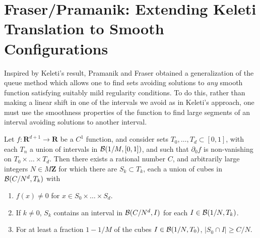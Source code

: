 \section{Fraser/Pramanik: Extending Keleti Translation to Smooth Configurations}

Inspired by Keleti's result, Pramanik and Fraser obtained a generalization of the queue method which allows one to find sets avoiding solutions to {\it any} smooth function satisfying suitably mild regularity conditions. To do this, rather than making a linear shift in one of the intervals we avoid as in Keleti's approach, one must use the smoothness properties of the function to find large segments of an interval avoiding solutions to another interval.

\begin{theorem}
    Let $f: \mathbf{R}^{d+1} \to \mathbf{R}$ be a $C^1$ function, and consider sets $T_0, \dots, T_d \subset [0,1]$, with each $T_n$ a union of intervals in $\operatorname{\mathcal{B}}(1/M,[0,1])$, and such that $\partial_0 f$ is non-vanishing on $T_0 \times \dots \times T_d$. Then there exists a rational number $C$, and arbitrarily large integers $N \in M \mathbf{Z}$ for which there are $S_k \subset T_k$, each a union of cubes in $\operatorname{\mathcal{B}}(C/N^d,T_k)$ with
    \begin{enumerate}
        \item $f(x) \neq 0$ for $x \in S_0 \times \dots \times S_d$.

        \item If $k \neq 0$, $S_k$ contains an interval in $\operatorname{\mathcal{B}}(C/N^d,I)$ for each $I \in \operatorname{\mathcal{B}}(1/N,T_k)$.

        \item For at least a fraction $1 - 1/M$ of the cubes $I \in \operatorname{\mathcal{B}}(1/N,T_0)$, $|S_0 \cap I| \geq C/N$.
    \end{enumerate}
\end{theorem}
